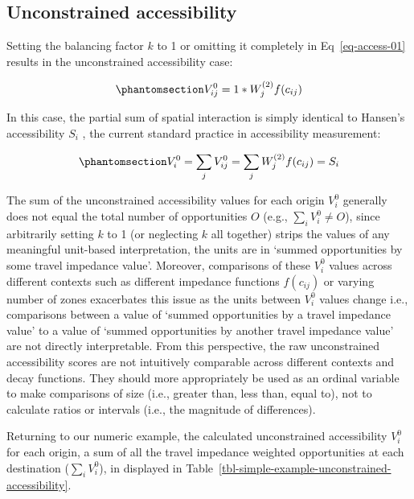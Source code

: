 \documentclass[
  10pt,
  letterpaper,
]{article}
\begin{document}
\subsection{Unconstrained
accessibility}\label{unconstrained-accessibility}

Setting the balancing factor \(k\) to 1 or omitting it completely in
Eq~\ref{eq-access-01} results in the unconstrained accessibility case:

\begin{equation}\phantomsection\label{eq-unconstrained-access}{
V^0_{ij} = 1 *W_j^{(2)} f(c_{ij})
}\end{equation}

In this case, the partial sum of spatial interaction is simply identical
to Hansen's accessibility \(S_i\) \citep{hansen1959}, the current
standard practice in accessibility measurement:

\begin{equation}\phantomsection\label{eq-unconstrained-accessibility}{
V^0_i = \sum_j V^0_{ij} = \sum_j W^{(2)}_jf(c_{ij}) = S_i
}\end{equation}

The sum of the unconstrained accessibility values for each origin
\(V^0_{i}\) generally does not equal the total number of opportunities
\(O\) (e.g., \(\sum_i V^0_{i} \not= O\)), since arbitrarily setting
\(k\) to 1 (or neglecting \(k\) all together) strips the values of any
meaningful unit-based interpretation, the units are in `summed
opportunities by some travel impedance value'. Moreover, comparisons of
these \(V^0_{i}\) values across different contexts such as different
impedance functions \(f(c_{ij})\) or varying number of zones exacerbates
this issue as the units between \(V^0_{i}\) values change i.e.,
comparisons between a value of `summed opportunities by a travel
impedance value' to a value of `summed opportunities by another travel
impedance value' are not directly interpretable. From this perspective,
the raw unconstrained accessibility scores are not intuitively
comparable across different contexts and decay functions. They should
more appropriately be used as an ordinal variable to make comparisons of
size (i.e., greater than, less than, equal to), not to calculate ratios
or intervals (i.e., the magnitude of differences).

Returning to our numeric example, the calculated unconstrained
accessibility \(V^0_{i}\) for each origin, a sum of all the travel
impedance weighted opportunities at each destination
(\(\sum_i V^0_{i}\)), in displayed in
Table~\ref{tbl-simple-example-unconstrained-accessibility}.
\end{document}

